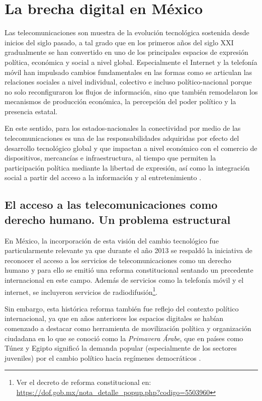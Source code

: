 \documentclass[
  spanish,
  11pt,
  a4paper,
]{scrbook}
\begin{document}
\section*{La brecha digital en
México}\label{la-brecha-digital-en-muxe9xico}


Las telecomunicaciones son muestra de la evolución tecnológica sostenida
desde inicios del siglo pasado, a tal grado que en los primeros años del
siglo XXI gradualmente se han convertido en uno de los principales
espacios de expresión política, económica y social a nivel global.
Especialmente el Internet y la telefonía móvil han impulsado cambios
fundamentales en las formas como se articulan las relaciones sociales a
nivel individual, colectivo e incluso político-nacional porque no solo
reconfiguraron los flujos de información, sino que también remodelaron
los mecanismos de producción económica, la percepción del poder político
y la presencia estatal.

En este sentido, para los estados-nacionales la conectividad por medio
de las telecomunicaciones es una de las responsabilidades adquiridas por
efecto del desarrollo tecnológico global y que impactan a nivel
económico con el comercio de dispositivos, mercancías e infraestructura,
al tiempo que permiten la participación política mediante la libertad de
expresión, así como la integración social a partir del acceso a la
información y al entretenimiento \autocite{Castells2009,Scolari2013}.

\subsection*{El acceso a las telecomunicaciones como derecho humano. Un
problema
estructural}\label{el-acceso-a-las-telecomunicaciones-como-derecho-humano.-un-problema-estructural}

En México, la incorporación de esta visión del cambio tecnológico fue
particularmente relevante ya que durante el año 2013 se respaldó la
iniciativa de reconocer el acceso a los servicios de telecomunicaciones
como un derecho humano y para ello se emitió una reforma constitucional
sentando un precedente internacional en este campo. Además de servicios
como la telefonía móvil y el internet, se incluyeron servicios de
radiodifusión\footnote{Ver el decreto de reforma constitucional en:
  \url{https://dof.gob.mx/nota_detalle_popup.php?codigo=5503960}}.

Sin embargo, esta histórica reforma también fue reflejo del contexto
político internacional, ya que en años anteriores los espacios digitales
se habían comenzado a destacar como herramienta de movilización política
y organización ciudadana en lo que se conoció como la \emph{Primavera
Árabe}, que en países como Túnez y Egipto significó la demanda popular
(especialmente de los sectores juveniles) por el cambio político hacia
regímenes democráticos \autocite{Kamalova2020,Morozov2012}.
\end{document}
